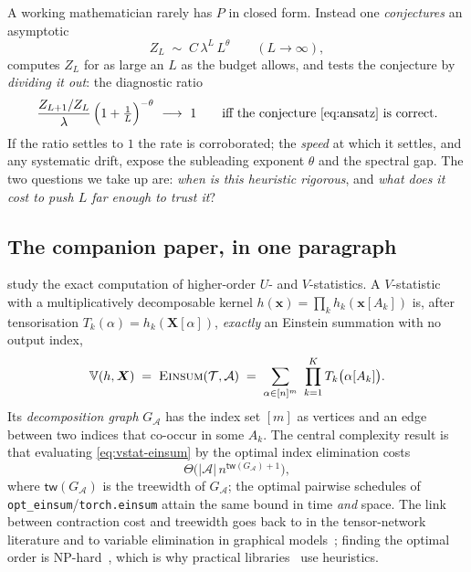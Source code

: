\documentclass[11pt]{article}
\newcommand{\Einsum}{\textsc{Einsum}}
\newcommand{\calA}{\mathcal{A}}
\newcommand{\calT}{\mathcal{T}}
\newcommand{\bX}{\bm{X}}
\newcommand{\tw}{\mathsf{tw}}
\newcommand{\treewidthp}[1]{\tw(#1)}
\newcommand{\graphform}[1]{G_{#1}}
\newcommand{\vstat}{\mathbb{V}}
\newcommand{\pressure}{P}
\newcommand{\opteinsum}{\texttt{opt\_einsum}}
\newcommand{\torch}{\texttt{torch.einsum}}
\theoremstyle{plain}
\theoremstyle{definition}
\theoremstyle{remark}
\begin{document}
A working mathematician rarely has $\pressure$ in closed form. Instead one
\emph{conjectures} an asymptotic
\begin{equation}
\label{eq:ansatz}
   Z_L \;\sim\; C\,\lambda^{L}\,L^{\theta}\qquad(L\to\infty),
\end{equation}
computes $Z_L$ for as large an $L$ as the budget allows, and tests the conjecture
by \emph{dividing it out}: the diagnostic ratio
\begin{equation}
\label{eq:divideout}
   \frac{Z_{L+1}/Z_L}{\lambda}\,\Bigl(1+\tfrac1L\Bigr)^{-\theta}\ \longrightarrow\ 1
   \qquad\text{iff the conjecture \eqref{eq:ansatz} is correct.}
\end{equation}
If the ratio settles to $1$ the rate is corroborated; the \emph{speed} at which it
settles, and any systematic drift, expose the subleading exponent $\theta$ and the
spectral gap. The two questions we take up are: \emph{when is this heuristic
rigorous}, and \emph{what does it cost to push $L$ far enough to trust it}?

\subsection{The companion paper, in one paragraph}

\citet{chen2024ustats} study the exact computation of higher-order
$U$- and $V$-statistics. A $V$-statistic with a multiplicatively decomposable
kernel $h(\bm x)=\prod_{k}h_k(\bm x[A_k])$ is, after tensorisation
$T_k(\alpha)=h_k(\bX[\alpha])$, \emph{exactly} an Einstein summation with no output
index,
\begin{equation}
\label{eq:vstat-einsum}
   \vstat(h,\bX)\;=\;\Einsum(\calT,\calA)\;=\;
   \sum_{\alpha\in[n]^m}\ \prod_{k=1}^{K}T_k\bigl(\alpha[A_k]\bigr).
\end{equation}
Its \emph{decomposition graph} $\graphform{\calA}$ has the index set $[m]$ as
vertices and an edge between two indices that co-occur in some $A_k$. The central
complexity result is that evaluating \eqref{eq:vstat-einsum} by the optimal index
elimination costs
\begin{equation}
\label{eq:treewidth-bound}
   \Theta\!\bigl(|\calA|\,n^{\treewidthp{\graphform{\calA}}+1}\bigr),
\end{equation}
where $\treewidthp{\graphform{\calA}}$ is the treewidth of $\graphform{\calA}$; the
optimal pairwise schedules of \opteinsum{}/\torch{} attain the same bound in time
\emph{and} space. The link between contraction cost and treewidth goes back to
\citet{markov2008simulating} in the tensor-network literature and to variable
elimination in graphical models~\citep{lauritzen1988local,bodlaender1993tourist};
finding the optimal order is NP-hard~\citep{arnborg1987complexity}, which is why
practical libraries~\citep{smith2018opt,gray2021hyper} use heuristics.
\end{document}
